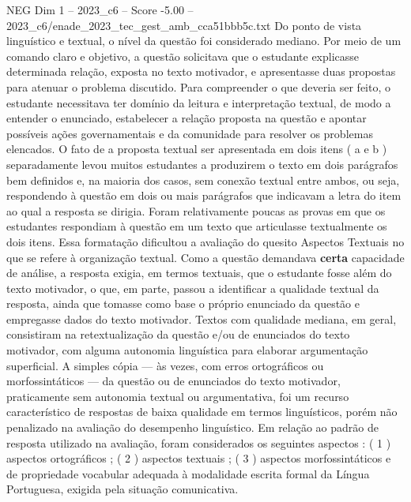 \begin{textsample}{NEG Dim 1 – 2023\_c6 – Score -5.00 – 2023\_c6/enade\_2023\_tec\_gest\_amb\_cca51bbb5c.txt}
Do ponto de vista linguístico e textual, o nível da questão foi considerado mediano.
Por meio de um comando claro e objetivo, a questão solicitava que o estudante explicasse determinada relação, exposta no texto motivador, e apresentasse duas propostas para atenuar o problema discutido.
Para compreender o que deveria ser feito, o estudante necessitava ter domínio da leitura e interpretação textual, de modo a entender o enunciado, estabelecer a relação proposta na questão e apontar possíveis ações governamentais e da comunidade para resolver os problemas elencados.
O fato de a proposta textual ser apresentada em dois itens ( a e b ) separadamente levou muitos estudantes a produzirem o texto em dois parágrafos bem definidos e, na maioria dos casos, sem conexão textual entre ambos, ou seja, respondendo à questão em dois ou mais parágrafos que indicavam a letra do item ao qual a resposta se dirigia.
Foram relativamente poucas as provas em que os estudantes respondiam à questão em um texto que articulasse textualmente os dois itens.
Essa formatação dificultou a avaliação do quesito Aspectos Textuais no que se refere à organização textual.
Como a questão demandava \textbf{certa} capacidade de análise, a resposta exigia, em termos textuais, que o estudante fosse além do texto motivador, o que, em parte, passou a identificar a qualidade textual da resposta, ainda que tomasse como base o próprio enunciado da questão e empregasse dados do texto motivador.
Textos com qualidade mediana, em geral, consistiram na retextualização da questão e/ou de enunciados do texto motivador, com alguma autonomia linguística para elaborar argumentação superficial.
A simples cópia — às vezes, com erros ortográficos ou morfossintáticos — da questão ou de enunciados do texto motivador, praticamente sem autonomia textual ou argumentativa, foi um recurso característico de respostas de baixa qualidade em termos linguísticos, porém não penalizado na avaliação do desempenho linguístico.
Em relação ao padrão de resposta utilizado na avaliação, foram considerados os seguintes aspectos : ( 1 ) aspectos ortográficos ; ( 2 ) aspectos textuais ; ( 3 ) aspectos morfossintáticos e de propriedade vocabular adequada à modalidade escrita formal da Língua Portuguesa, exigida pela situação comunicativa.

\end{textsample}

